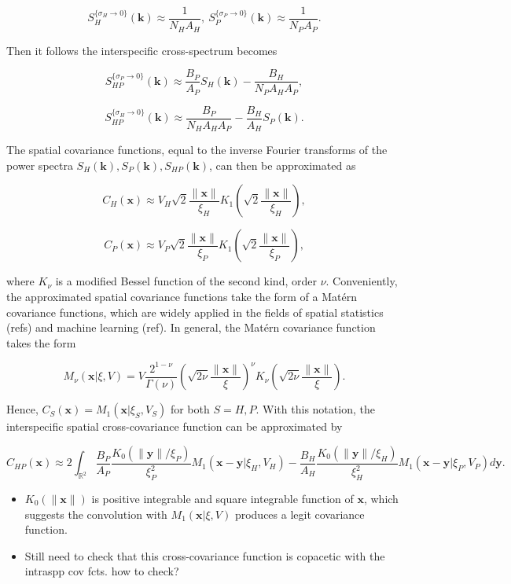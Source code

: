 \documentclass{article}
\begin{document}
\[S_H^{\{\sigma_H\to0\}}(\pmb k)\approx\frac{1}{N_HA_H}, \ S_P^{\{\sigma_P\to0\}}(\pmb k)\approx\frac{1}{N_PA_P}.\]

Then it follows the interspecific cross-spectrum becomes

\[S_{HP}^{\{\sigma_P\to0\}}(\pmb k)\approx\frac{B_P}{A_P}S_H(\pmb k)-\frac{B_H}{N_PA_HA_P},\]

\[S_{HP}^{\{\sigma_H\to0\}}(\pmb k)\approx\frac{B_P}{N_HA_HA_P}-\frac{B_H}{A_H}S_P(\pmb k).\]

The spatial covariance functions, equal to the inverse Fourier
transforms of the power spectra
\(S_H(\pmb k),S_P(\pmb k),S_{HP}(\pmb k)\), can then be approximated as

\[C_H(\pmb x)\approx V_H\sqrt2\frac{\|\pmb x\|}{\xi_H}K_1\left(\sqrt2\frac{\|\pmb x\|}{\xi_H}\right),\]

\[C_P(\pmb x)\approx V_P\sqrt2\frac{\|\pmb x\|}{\xi_P}K_1\left(\sqrt2\frac{\|\pmb x\|}{\xi_P}\right),\]

where \(K_\nu\) is a modified Bessel function of the second kind, order
\(\nu\). Conveniently, the approximated spatial covariance functions
take the form of a Matérn covariance functions, which are widely applied
in the fields of spatial statistics (refs) and machine learning (ref).
In general, the Matérn covariance function takes the form

\[M_\nu(\pmb x|\xi,V)=V\frac{2^{1-\nu}}{\Gamma(\nu)}\left(\sqrt{2\nu}\frac{\|\pmb x\|}{\xi}\right)^\nu K_\nu\left(\sqrt{2\nu}\frac{\|\pmb x\|}{\xi}\right).\]

Hence, \(C_S(\pmb x)=M_1(\pmb x|\xi_S,V_S)\) for both \(S=H,P\). With
this notation, the interspecific spatial cross-covariance function can
be approximated by

\[C_{HP}(\pmb x)\approx 2\int_{\mathbb R^2}\frac{B_P}{A_P}\frac{K_0(\|\pmb y\|/\xi_P)}{\xi_P^2}M_1(\pmb x-\pmb y|\xi_H,V_H)-\frac{B_H}{A_H}\frac{K_0(\|\pmb y\|/\xi_H)}{\xi_H^2}M_1(\pmb x-\pmb y|\xi_P,V_P)d\pmb y.\]

\begin{itemize}
\item
  \(K_0(\|\pmb x\|)\) is positive integrable and square integrable
  function of \(\pmb x\), which suggests the convolution with
  \(M_1(\pmb x|\xi,V)\) produces a legit covariance function.
\item
  Still need to check that this cross-covariance function is copacetic
  with the intraspp cov fcts. how to check?
\end{itemize}
\end{document}

